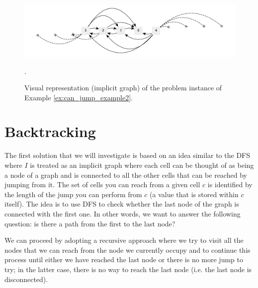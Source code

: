 \begin{figure}
    \centering
    \includegraphics[width=\textwidth]{sources/can_jump/images/example2}
    \caption[Implicit graph for the Example \ref{ex:can_jump_example2}.]
    {Visual representation (implicit graph) of the problem instance of Example
    \ref{ex:can_jump_example2}.}.
    \label{fig:can_jump:example2}
\end{figure}


    

\section{Backtracking}
\label{can_jump:sec:backtracking}
The first solution that we will investigate is based on an idea similar to the DFS where $I$
is treated as an implicit graph where each cell can be thought of as being a node of a graph and is connected to all the other cells that can be
reached by jumping from it.
The set of cells you can reach from a given cell $c$ is identified by
the length of the jump you can perform from $c$ (a value that is stored within $c$ itself).
The idea is to use DFS to check whether the last node of the graph is connected with the first one.
In other words, we want to answer the following question: is there a path from the first to the last node?

We can proceed by adopting a recursive approach where we try to visit all the nodes that we can reach from the node we currently
occupy and to continue this process until either we have reached the last node or there is no more
jump to try; in the latter case,  there is no way to reach the last node (i.e. the last node is
disconnected). 

